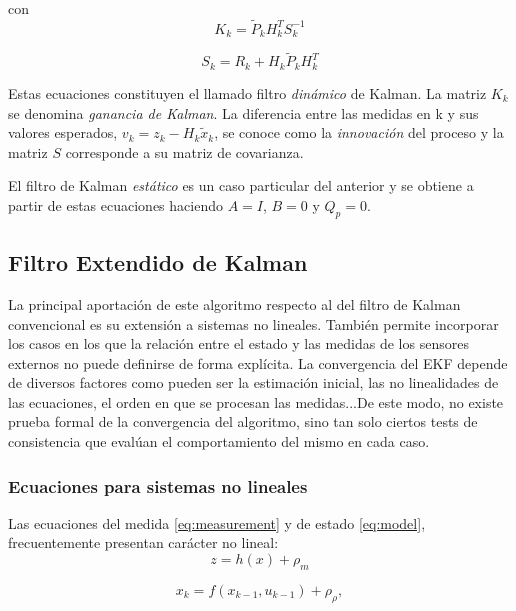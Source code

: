 con
\begin{equation}\label{eq:K}
    K_{k} = \tilde{P}_{k}H_{k}^{T}S_{k}^{-1}
\end{equation}

\begin{equation}\label{eq:S}
    S_{k} = R_{k}+H_{k}\tilde{P}_{k}H_{k}^{T}
\end{equation}

Estas ecuaciones constituyen el llamado filtro \emph{dinámico} de Kalman.
La matriz $K_{k}$ se denomina \emph{ganancia de Kalman}.
La diferencia entre las medidas en k y sus valores esperados, $v_{k} = z_{k}-H_{k}\tilde{x}_{k}$, se conoce como la \emph{innovación} del proceso y la matriz $S$ corresponde a su matriz de covarianza.

El filtro de Kalman \emph{estático} es un caso particular del anterior y se obtiene a partir de estas ecuaciones haciendo $A = I$, $B = 0$ y $Q_{p} = 0$.

\subsection{Filtro Extendido de Kalman}
La principal aportación de este algoritmo respecto al del filtro de Kalman convencional es su extensión a sistemas no lineales. También permite incorporar los casos en los que la relación entre el estado y las medidas de los sensores externos no puede definirse de forma explícita. La convergencia del EKF depende de diversos factores como pueden ser la estimación inicial, las no linealidades de las ecuaciones, el orden en que se procesan las medidas...De este modo, no existe prueba formal de la convergencia del algoritmo, sino tan solo ciertos tests de consistencia que evalúan el comportamiento del mismo en cada caso.

\subsubsection{Ecuaciones para sistemas no lineales}
Las ecuaciones del medida \ref{eq:measurement} y de estado \ref{eq:model}, frecuentemente presentan carácter no lineal:
\begin{equation}\label{eq:medida_nolineal}
    z = h(x)+\rho_{m}
\end{equation}

\begin{equation}\label{eq:estado_nolineal}
    x_{k} = f(x_{k-1},u_{k-1})+\rho_{\rho},
\end{equation}

